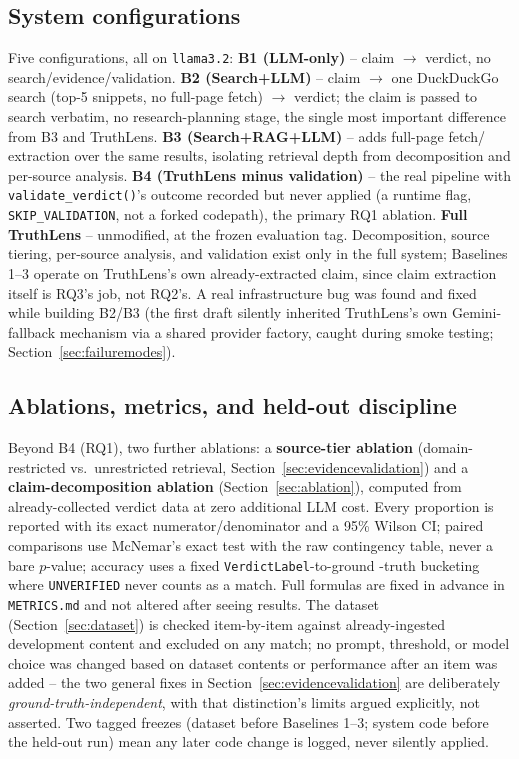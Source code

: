 \documentclass[conference]{IEEEtran}
\begin{document}
\subsection{System configurations}
Five configurations, all on \texttt{llama3.2}: \textbf{B1 (LLM-only)} --
claim $\to$ verdict, no search/evidence/validation. \textbf{B2
(Search+LLM)} -- claim $\to$ one DuckDuckGo search (top-5 snippets, no
full-page fetch) $\to$ verdict; the claim is passed to search verbatim,
no research-planning stage, the single most important difference from B3
and TruthLens. \textbf{B3 (Search+RAG+LLM)} -- adds full-page fetch/
extraction over the same results, isolating retrieval depth from
decomposition and per-source analysis. \textbf{B4 (TruthLens minus
validation)} -- the real pipeline with \texttt{validate\_verdict()}'s
outcome recorded but never applied (a runtime flag, \texttt{SKIP\_VALIDATION},
not a forked codepath), the primary RQ1 ablation. \textbf{Full TruthLens}
-- unmodified, at the frozen evaluation tag. Decomposition, source
tiering, per-source analysis, and validation exist only in the full
system; Baselines 1--3 operate on TruthLens's own already-extracted
claim, since claim extraction itself is RQ3's job, not RQ2's. A real
infrastructure bug was found and fixed while building B2/B3 (the first
draft silently inherited TruthLens's own Gemini-fallback mechanism via a
shared provider factory, caught during smoke testing;
Section~\ref{sec:failuremodes}).

\subsection{Ablations, metrics, and held-out discipline}
Beyond B4 (RQ1), two further ablations: a \textbf{source-tier ablation}
(domain-restricted vs.\ unrestricted retrieval,
Section~\ref{sec:evidencevalidation}) and a \textbf{claim-decomposition
ablation} (Section~\ref{sec:ablation}), computed from already-collected
verdict data at zero additional LLM cost. Every proportion is reported
with its exact numerator/denominator and a 95\% Wilson CI; paired
comparisons use McNemar's exact test with the raw contingency table, never
a bare $p$-value; accuracy uses a fixed \texttt{VerdictLabel}-to-ground
-truth bucketing where \texttt{UNVERIFIED} never counts as a match. Full
formulas are fixed in advance in \texttt{METRICS.md} and not altered
after seeing results. The dataset (Section~\ref{sec:dataset}) is checked
item-by-item against already-ingested development content and excluded
on any match; no prompt, threshold, or model choice was changed based on
dataset contents or performance after an item was added -- the two
general fixes in Section~\ref{sec:evidencevalidation} are deliberately
\emph{ground-truth-independent}, with that distinction's limits argued
explicitly, not asserted. Two tagged freezes (dataset before Baselines
1--3; system code before the held-out run) mean any later code change is
logged, never silently applied.
\end{document}
